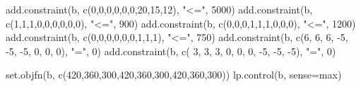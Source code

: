 \documentclass[
]{article}
\newenvironment{Shaded}{\begin{snugshade}}{\end{snugshade}}
\newcommand{\AttributeTok}[1]{\textcolor[rgb]{0.77,0.63,0.00}{#1}}
\newcommand{\DecValTok}[1]{\textcolor[rgb]{0.00,0.00,0.81}{#1}}
\newcommand{\FunctionTok}[1]{\textcolor[rgb]{0.00,0.00,0.00}{#1}}
\newcommand{\NormalTok}[1]{#1}
\newcommand{\SpecialCharTok}[1]{\textcolor[rgb]{0.00,0.00,0.00}{#1}}
\newcommand{\StringTok}[1]{\textcolor[rgb]{0.31,0.60,0.02}{#1}}
\begin{document}
\begin{Shaded}
\begin{Highlighting}[]
\FunctionTok{add.constraint}\NormalTok{(b, }\FunctionTok{c}\NormalTok{(}\DecValTok{0}\NormalTok{,}\DecValTok{0}\NormalTok{,}\DecValTok{0}\NormalTok{,}\DecValTok{0}\NormalTok{,}\DecValTok{0}\NormalTok{,}\DecValTok{0}\NormalTok{,}\DecValTok{20}\NormalTok{,}\DecValTok{15}\NormalTok{,}\DecValTok{12}\NormalTok{), }\StringTok{"\textless{}="}\NormalTok{, }\DecValTok{5000}\NormalTok{)}
\FunctionTok{add.constraint}\NormalTok{(b, }\FunctionTok{c}\NormalTok{(}\DecValTok{1}\NormalTok{,}\DecValTok{1}\NormalTok{,}\DecValTok{1}\NormalTok{,}\DecValTok{0}\NormalTok{,}\DecValTok{0}\NormalTok{,}\DecValTok{0}\NormalTok{,}\DecValTok{0}\NormalTok{,}\DecValTok{0}\NormalTok{,}\DecValTok{0}\NormalTok{), }\StringTok{"\textless{}="}\NormalTok{, }\DecValTok{900}\NormalTok{)}
\FunctionTok{add.constraint}\NormalTok{(b, }\FunctionTok{c}\NormalTok{(}\DecValTok{0}\NormalTok{,}\DecValTok{0}\NormalTok{,}\DecValTok{0}\NormalTok{,}\DecValTok{1}\NormalTok{,}\DecValTok{1}\NormalTok{,}\DecValTok{1}\NormalTok{,}\DecValTok{0}\NormalTok{,}\DecValTok{0}\NormalTok{,}\DecValTok{0}\NormalTok{), }\StringTok{"\textless{}="}\NormalTok{, }\DecValTok{1200}\NormalTok{)}
\FunctionTok{add.constraint}\NormalTok{(b, }\FunctionTok{c}\NormalTok{(}\DecValTok{0}\NormalTok{,}\DecValTok{0}\NormalTok{,}\DecValTok{0}\NormalTok{,}\DecValTok{0}\NormalTok{,}\DecValTok{0}\NormalTok{,}\DecValTok{0}\NormalTok{,}\DecValTok{1}\NormalTok{,}\DecValTok{1}\NormalTok{,}\DecValTok{1}\NormalTok{), }\StringTok{"\textless{}="}\NormalTok{, }\DecValTok{750}\NormalTok{)}
\FunctionTok{add.constraint}\NormalTok{(b, }\FunctionTok{c}\NormalTok{(}\DecValTok{6}\NormalTok{, }\DecValTok{6}\NormalTok{, }\DecValTok{6}\NormalTok{, }\SpecialCharTok{{-}}\DecValTok{5}\NormalTok{, }\SpecialCharTok{{-}}\DecValTok{5}\NormalTok{, }\SpecialCharTok{{-}}\DecValTok{5}\NormalTok{, }\DecValTok{0}\NormalTok{, }\DecValTok{0}\NormalTok{, }\DecValTok{0}\NormalTok{), }\StringTok{"="}\NormalTok{, }\DecValTok{0}\NormalTok{)}
\FunctionTok{add.constraint}\NormalTok{(b, }\FunctionTok{c}\NormalTok{( }\DecValTok{3}\NormalTok{, }\DecValTok{3}\NormalTok{, }\DecValTok{3}\NormalTok{, }\DecValTok{0}\NormalTok{, }\DecValTok{0}\NormalTok{, }\DecValTok{0}\NormalTok{, }\SpecialCharTok{{-}}\DecValTok{5}\NormalTok{, }\SpecialCharTok{{-}}\DecValTok{5}\NormalTok{, }\SpecialCharTok{{-}}\DecValTok{5}\NormalTok{), }\StringTok{"="}\NormalTok{, }\DecValTok{0}\NormalTok{)}

\FunctionTok{set.objfn}\NormalTok{(b, }\FunctionTok{c}\NormalTok{(}\DecValTok{420}\NormalTok{,}\DecValTok{360}\NormalTok{,}\DecValTok{300}\NormalTok{,}\DecValTok{420}\NormalTok{,}\DecValTok{360}\NormalTok{,}\DecValTok{300}\NormalTok{,}\DecValTok{420}\NormalTok{,}\DecValTok{360}\NormalTok{,}\DecValTok{300}\NormalTok{))}
\FunctionTok{lp.control}\NormalTok{(b, }\AttributeTok{sense=}\StringTok{\textquotesingle{}max\textquotesingle{}}\NormalTok{)}
\end{Highlighting}
\end{Shaded}
\end{document}
